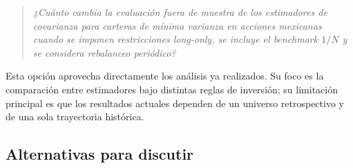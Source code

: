 \documentclass[11pt]{article}
\begin{document}
\begin{quote}
\emph{¿Cuánto cambia la evaluación fuera de muestra de los estimadores de
covarianza para carteras de mínima varianza en acciones mexicanas cuando se
imponen restricciones long-only, se incluye el benchmark $1/N$ y se considera
rebalanceo periódico?}
\end{quote}

Esta opción aprovecha directamente los análisis ya realizados. Su foco es la
comparación entre estimadores bajo distintas reglas de inversión; su
limitación principal es que los resultados actuales dependen de un universo
retrospectivo y de una sola trayectoria histórica.

\subsection{Alternativas para discutir}
\end{document}
